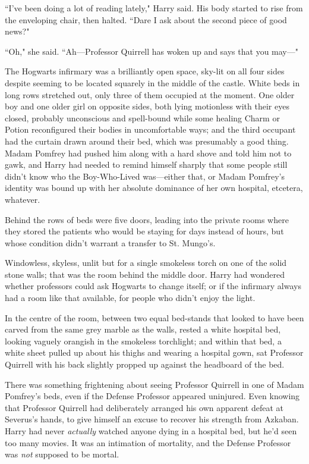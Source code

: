 ``I've been doing a lot of reading lately," Harry said. His body started to rise from the enveloping chair, then halted. ``Dare I ask about the second piece of good news?"

``Oh," she said. ``Ah—Professor Quirrell has woken up and says that you may—"

\later

The Hogwarts infirmary was a brilliantly open space, sky-lit on all four sides despite seeming to be located squarely in the middle of the castle. White beds in long rows stretched out, only three of them occupied at the moment. One older boy and one older girl on opposite sides, both lying motionless with their eyes closed, probably unconscious and spell-bound while some healing Charm or Potion reconfigured their bodies in uncomfortable ways; and the third occupant had the curtain drawn around their bed, which was presumably a good thing. Madam Pomfrey had pushed him along with a hard shove and told him not to gawk, and Harry had needed to remind himself sharply that some people still didn't know who the Boy-Who-Lived was—either that, or Madam Pomfrey's identity was bound up with her absolute dominance of her own hospital, etcetera, whatever.

Behind the rows of beds were five doors, leading into the private rooms where they stored the patients who would be staying for days instead of hours, but whose condition didn't warrant a transfer to St. Mungo's.

Windowless, skyless, unlit but for a single smokeless torch on one of the solid stone walls; that was the room behind the middle door. Harry had wondered whether professors could ask Hogwarts to change itself; or if the infirmary always had a room like that available, for people who didn't enjoy the light.

In the centre of the room, between two equal bed-stands that looked to have been carved from the same grey marble as the walls, rested a white hospital bed, looking vaguely orangish in the smokeless torchlight; and within that bed, a white sheet pulled up about his thighs and wearing a hospital gown, sat Professor Quirrell with his back slightly propped up against the headboard of the bed.

There was something frightening about seeing Professor Quirrell in one of Madam Pomfrey's beds, even if the Defense Professor appeared uninjured. Even knowing that Professor Quirrell had deliberately arranged his own apparent defeat at Severus's hands, to give himself an excuse to recover his strength from Azkaban. Harry had never \emph{actually} watched anyone dying in a hospital bed, but he'd seen too many movies. It was an intimation of mortality, and the Defense Professor was \emph{not} supposed to be mortal.

